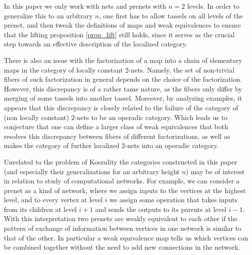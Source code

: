 \documentclass[letterpaper,12pt,leqno]{article}
\numberwithin{equation}{theorem}
\begin{document}
\begin{nparagraph}[Shortcomings.]
In this paper we only work with nets and prenets with $n = 2$ levels. In order to generalize this to an arbitrary $n$, one first has to allow tassels on all levels of the
prenet, and then tweak the definitions of maps and weak equivalences to ensure that the lifting proposition \ref{prop_lift} still holds, since it serves as the crucial step
towards an effective description of the localized category.

There is also an issue with the factorization of a map into a chain of elementary maps in the category of locally constant $2$-nets. Namely, the set of non-trivial fibers of such factorization
in general depends on the choice of the factorization. However, this discrepancy is of a rather tame nature, as the fibers only differ by merging of some tassels into another tassel.
Moreover, by analyzing examples, it appears that this discrepancy is closely related to the failure of the category of (non locally constant) $2$-nets to be an operadic category.
Which leads us to conjecture that one can define a larger class of weak equivalences that both resolves this discrepancy between fibers of different factorizations, as well as makes
the category of further localized $2$-nets into an operadic category.

\end{nparagraph}

\begin{nparagraph}
Unrelated to the problem of Koszulity the categories constructed in this paper (and especially their generalizations for an arbitrary height $n$)
may be of interest in relation to study of computational networks. For example, we can consider a prenet as a kind of network, where we assign inputs to the vertices at the highest level,
and to every vertex at level $i$ we assign some operation that takes inputs from its children at level $i + 1$ and sends the outputs to its parents at level $i - 1$. With this interpretation
two prenets are weakly equivalent to each other if the pattern of exchange of information between vertices in one network is similar to that of the other. In particular a weak
equivalence map tells us which vertices can be combined together without the need to add new connections in the network.

\end{nparagraph}
\end{document}
